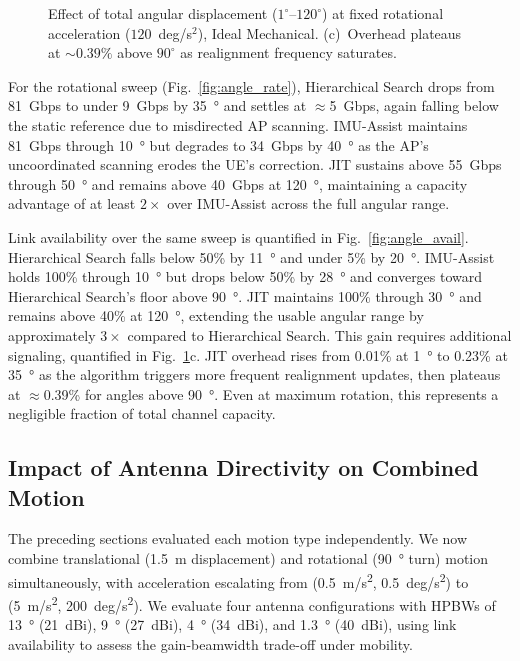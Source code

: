 \documentclass[fleqn,10pt]{wlscirep}
\begin{document}
\begin{figure}[ht!]
    \caption{Effect of total angular displacement ($1^\circ$--$120^\circ$) at fixed rotational acceleration ($120$~deg/s$^2$), Ideal Mechanical. (c)~Overhead plateaus at ${\sim}0.39\%$ above $90^\circ$ as realignment frequency saturates.}
    \label{fig:angle_effects}
    \vspace{-5pt}
\end{figure}

For the rotational sweep (Fig.~\ref{fig:angle_rate}), Hierarchical Search drops from \SI{81}{Gbps} to under \SI{9}{Gbps} by \SI{35}{\degree} and settles at $\approx$\SI{5}{Gbps}, again falling below the static reference due to misdirected AP scanning. IMU-Assist maintains \SI{81}{Gbps} through \SI{10}{\degree} but degrades to \SI{34}{Gbps} by \SI{40}{\degree} as the AP's uncoordinated scanning erodes the UE's correction. JIT sustains above \SI{55}{Gbps} through \SI{50}{\degree} and remains above \SI{40}{Gbps} at \SI{120}{\degree}, maintaining a capacity advantage of at least $2\times$ over IMU-Assist across the full angular range.

Link availability over the same sweep is quantified in Fig.~\ref{fig:angle_avail}. Hierarchical Search falls below 50\% by \SI{11}{\degree} and under 5\% by \SI{20}{\degree}. IMU-Assist holds 100\% through \SI{10}{\degree} but drops below 50\% by \SI{28}{\degree} and converges toward Hierarchical Search's floor above \SI{90}{\degree}. JIT maintains 100\% through \SI{30}{\degree} and remains above 40\% at \SI{120}{\degree}, extending the usable angular range by approximately $3\times$ compared to Hierarchical Search. This gain requires additional signaling, quantified in Fig.~\ref{fig:angle_effects}c. JIT overhead rises from 0.01\% at \SI{1}{\degree} to 0.23\% at \SI{35}{\degree} as the algorithm triggers more frequent realignment updates, then plateaus at $\approx$0.39\% for angles above \SI{90}{\degree}. Even at maximum rotation, this represents a negligible fraction of total channel capacity.



\subsection*{Impact of Antenna Directivity on Combined Motion}

The preceding sections evaluated each motion type independently. We now combine translational (\SI{1.5}{m} displacement) and rotational (\SI{90}{\degree} turn) motion simultaneously, with acceleration escalating from (\SI{0.5}{m/s^2}, \SI{0.5}{deg/s^2}) to (\SI{5}{m/s^2}, \SI{200}{deg/s^2}). We evaluate four antenna configurations with HPBWs of \SI{13}{\degree} (\SI{21}{dBi}), \SI{9}{\degree} (\SI{27}{dBi}), \SI{4}{\degree} (\SI{34}{dBi}), and \SI{1.3}{\degree} (\SI{40}{dBi}), using link availability to assess the gain-beamwidth trade-off under mobility.
\end{document}
